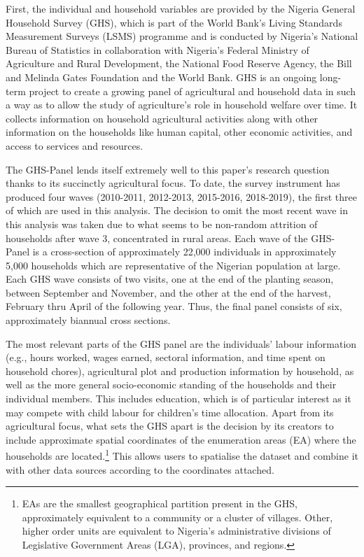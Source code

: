 \documentclass[a4paper,12pt]{article}
\theoremstyle{plain}
\theoremstyle{definition}
\theoremstyle{definition}
\theoremstyle{definition}
\theoremstyle{definition}
\begin{document}
First, the individual and household variables are provided by the Nigeria General Household Survey (GHS), which is part of the World Bank's Living Standards Measurement Surveys (LSMS) programme and is conducted by Nigeria's National Bureau of Statistics in collaboration with Nigeria's Federal Ministry of Agriculture and Rural Development, the National Food Reserve Agency, the Bill and Melinda Gates Foundation and the World Bank. GHS is an ongoing long-term project to create a growing panel of agricultural and household data in such a way as to allow the study of agriculture’s role in household welfare over time. It collects information on household agricultural activities along with other information on the households like human capital, other economic activities, and access to services and resources.

The GHS-Panel lends itself extremely well to this paper's research question thanks to its succinctly agricultural focus. To date, the survey instrument has produced four waves (2010-2011, 2012-2013, 2015-2016, 2018-2019), the first three of which are used in this analysis. The decision to omit the most recent wave in this analysis was taken due to what seems to be non-random attrition of households after wave 3, concentrated in rural areas. Each wave of the GHS-Panel is a cross-section of approximately 22,000 individuals in approximately 5,000 households which are representative of the Nigerian population at large. Each GHS wave consists of two visits, one at the end of the planting season, between September and November, and the other at the end of the harvest, February thru April of the following year. Thus, the final panel consists of six, approximately biannual cross sections.

The most relevant parts of the GHS panel are the individuals' labour information (e.g., hours worked, wages earned, sectoral information, and time spent on household chores), agricultural plot and production information by household, as well as the more general socio-economic standing of the households and their individual members. This includes education, which is of particular interest as it may compete with child labour for children's time allocation. Apart from its agricultural focus, what sets the GHS apart is the decision by its creators to include approximate spatial coordinates of the enumeration areas (EA) where the households are located.\footnote{EAs are the smallest geographical partition present in the GHS, approximately equivalent to a community or a cluster of villages. Other, higher order units are equivalent to Nigeria's administrative divisions of Legislative Government Areas (LGA), provinces, and regions.} This allows users to spatialise the dataset and combine it with other data sources according to the coordinates attached.
\end{document}
